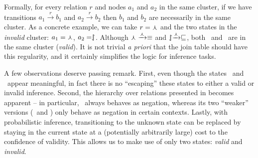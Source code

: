 Formally, for every relation $r$ and nodes $a_1$ and $a_2$ in
  the same cluster, if we have transitions 
  $a_1 \xrightarrow{r} b_1$ and $a_2 \xrightarrow{r} b_2$
  then $b_1$ and $b_2$ are necessarily in the same cluster.
As a concrete example, we can take $r = \curlywedge$ and
  the two states in the \textit{invalid} cluster:
  $a_1 = \curlywedge$, $a_2 = \downharpoonleft\hspace{-1.25mm}\upharpoonright$.
Although $\curlywedge \xrightarrow{\curlywedge} \equiv$ and
  $\downharpoonleft\hspace{-1.25mm}\upharpoonright \xrightarrow{\curlywedge} \sqsubseteq$, both
  \equivalent\ and \forward\ are in the same cluster (\textit{valid}).
It is not trivial \textit{a priori} that the join table should have
  this regularity, and it certainly simplifies the logic for
  inference tasks.

A few observations deserve passing remark.
First, even though the
  states \reverse\ and \cover\ appear meaningful, in fact there is no
  ``escaping'' these states to either a valid or invalid
  inference.
Second, the hierarchy over relations presented in
   becomes apparent -- in particular,
  \negate\ always behaves as negation, whereas its two ``weaker''
  versions (\alternate\ and \cover) only behave as negation in certain
  contexts.
Lastly, with probabilistic inference,
  transitioning to the unknown state can be replaced by staying in the
  current state at a (potentially arbitrarily large) cost to the 
  confidence of validity.
This allows us to make use of only two states:
  \textit{valid} and \textit{invalid}.

